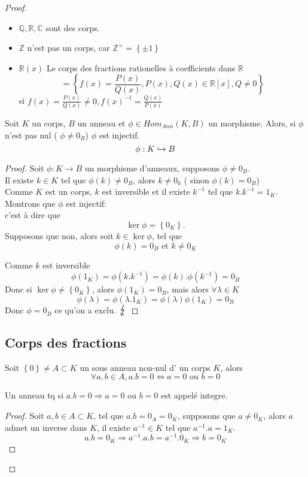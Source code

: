 \documentclass[../main.tex]{subfiles}
\begin{document}
\begin{proof}
\begin{exemple}
\begin{itemize}
\item $\mathbb{Q}, \mathbb{R}, \mathbb{C}$ sont des corps.
\item $\mathbb{Z}$ n'est pas un corps, car $\mathbb{Z}^{\times}= \left\{ \pm 1 \right\} $
\item $\mathbb{R}(x)$ Le corps des fractions rationelles à coefficients dans $\mathbb{R}$ 
	\[ 
		= \left\{ f(x) = \frac{P(x)}{Q(x)} , P(x), Q(x) \in \mathbb{R}[x], Q \neq 0\right\} 
	\]
	si $f(x) = \frac{P(x)}{Q(x)} \neq 0, f(x)^{-1}= \frac{Q(x)}{P(x)}$
\end{itemize}
\end{exemple}
\begin{propo}
	Soit $K$ un corps, $B$ un anneau et $\phi \in Hom_{Ann} ( K,B)$ un morphisme. Alors, si $\phi$ n'est pas nul ( $\phi \neq 0_B$) $\phi$ est injectif.
	\[ 
	\phi: K \hookrightarrow B
	\]
	
\end{propo}
\begin{proof}
Soit $\phi: K \to B $ un morphisme d'anneaux, supposons $\phi \neq 0_B$.\\
Il existe $k  \in K $ tel que $\phi(k) \neq 0_B$, alors $k \neq 0_k$ ( sinon $\phi(k) = 0_B$)\\
Comme $K$ est un corps, $k$ est inversible et il existe $k^{-1}$ tel que $k . k^{-1}= 1_K$.\\
Montrons que $\phi$ est injectif:\\
c'est à dire que 
\[ 
	\ker \phi = \left\{ 0_K \right\} .
\]
Supposons que non, alors soit $k \in \ker \phi$, tel que 
\[ 
	\phi(k) = 0_B \text{ et  } k \neq  0_K
\]

Comme $k$ est inversible
\[ 
	\phi(1_K) = \phi(k.k^{-1}) = \phi(k) . \phi(k^{-1}) = 0_B
\]
Donc si $\ker \phi \neq \left\{ 0_K \right\}$, alors $\phi(1_K) = 0_B$, mais alors $\forall \lambda \in K$
\[ 
	\phi( \lambda) = \phi(\lambda . 1_K) = \phi(\lambda) \phi(1_K) = 0_B
\]
Donc $\phi = 0_B$ ce qu'on a exclu. $\contra$


\end{proof}
\subsection{Corps des fractions}
\begin{lemma}
Soit $ \left\{ 0 \right\} \neq A \subset K$ un sous anneau non-nul d' un corps $K$, alors
\[ 
\forall a,b \in A, a.b = 0 \iff a =0 \text{ ou } b=0
\]
\end{lemma}
\begin{defn}
Un anneau tq si $a.b=0 \Rightarrow a=0 \text{ ou } b=0$ est appelé integre.
\end{defn}
\begin{proof}
Soit $a,b \in A \subset K$, tel que $a.b =0_A = 0_K$, supposons que 
$a \neq 0_K$, alors $a$ admet un inverse dans $K$, il existe $a^{-1}\in K$ tel que $a^{-1}.a = 1_K$.\\
\[ 
a.b = 0_K \Rightarrow a^{-1}.a.b = a^{-1}. 0_K \Rightarrow b =0_K
\]


\end{proof}
\end{proof}
\end{document}
